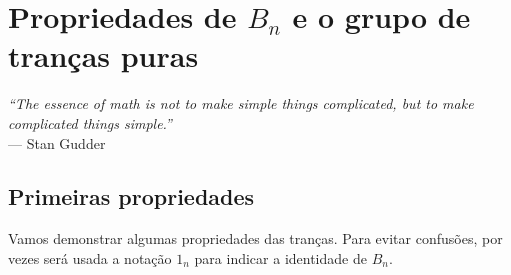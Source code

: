 \chapter[Propriedades de \texorpdfstring{$B_n$}{Bn} e o grupo de tranças puras]{Propriedades de \texorpdfstring{$B_n$}{Bn} e o grupo de tranças puras}
\label{cap-4}
\chaptermark{}
%
\hfill%
\begin{minipage}{10cm}
\begin{flushright}
\rightskip=0.5cm
\textit{``The essence of math is not to make simple things complicated, but to make complicated things simple.''}
\\[0.1cm]
\rightskip=0.5cm
--- Stan Gudder
\end{flushright}
\end{minipage}

\section{Primeiras propriedades}

    Vamos demonstrar algumas propriedades das tranças. Para evitar confusões, por vezes será usada a notação $1_n$ para indicar a identidade de $B_n$.
	
	
	
